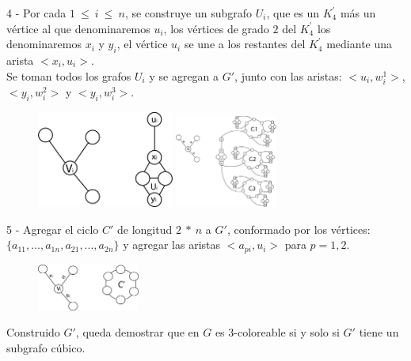 \documentclass{article}
\begin{document}
4 - Por cada $1~\leq ~i ~\leq~ n$, se construye un subgrafo $U_i$, que es un $K^{'}_4$ m\'as un v\'ertice al que denominaremos $u_{i}$, los v\'ertices de grado $2$ del $K^{'}_4$
los denominaremos $x_{i}$ y $y_{i}$, el v\'ertice $u_i$ se une a los restantes del  $K^{'}_4$ mediante una arista $<x_{i},u_i>$.\\ 



Se toman todos los grafos $U_i$ y se agregan a $G'$, junto con las aristas: $<u_i, w_i^1>$, $<y_i, w_i^2>$ y $<y_i, w_i^3>$. \\

\begin{figure}[!h]
    \centering
    \includegraphics[width= 0.4\textwidth ]{img4.png}
    \includegraphics[width= 0.3\textwidth ]{img5.png}
\end{figure}

5 - Agregar el ciclo $C'$ de longitud $2~*~n$ a $G'$, conformado por los v\'ertices: $\{ a_{11}, ... , a_{1n}, a_{21}, ... , a_{2n} \}$ y agregar las aristas 
$<a_{pi}, u_{i}>$ para $p = 1,2$.\\
\begin{figure}[!h]
    \centering
    \includegraphics[width= 0.3\textwidth ]{img6.png}
\end{figure}

Construido $G'$, queda demostrar que en $G$ es $3$-coloreable si y solo si $G'$ tiene un subgrafo c\'ubico. \\ 
\end{document}
